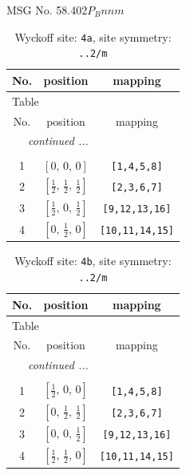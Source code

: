 \documentclass[fleqn,8pt]{jsarticle}
\begin{document}
\setcounter{MaxMatrixCols}{32}

\renewcommand{\tablename}{Table~}
\renewcommand{\figurename}{Figure~}
\begin{center}
\LARGE
MSG No. 58.402\quad$P_{B}nnm$
\end{center}
\renewcommand{\arraystretch}{1.2}
\begin{longtable}{ccc}
\caption{Wyckoff site: {\tt 4a}, site symmetry: {\tt ..2/m}}
 \\
 \hline \hline
No. & position & mapping \\ \hline \endfirsthead

\multicolumn{2}{l}{\tablename\ \thetable{}} \\
 \hline \hline
No. & position & mapping \\ \hline \endhead

 \hline \hline
\multicolumn{2}{r}{\footnotesize\it continued ...} \\ \endfoot

 \hline \hline
\multicolumn{2}{r}{} \\ \endlastfoot

1 & $\left[ 0,\, 0,\, 0 \right]$ & {\tt [1,4,5,8]} \\ \hline
2 & $\left[ \frac{1}{2},\, \frac{1}{2},\, \frac{1}{2} \right]$ & {\tt [2,3,6,7]} \\ \hline
3 & $\left[ \frac{1}{2},\, 0,\, \frac{1}{2} \right]$ & {\tt [9,12,13,16]} \\ \hline
4 & $\left[ 0,\, \frac{1}{2},\, 0 \right]$ & {\tt [10,11,14,15]} \\
\end{longtable}
\renewcommand{\arraystretch}{1.2}
\begin{longtable}{ccc}
\caption{Wyckoff site: {\tt 4b}, site symmetry: {\tt ..2/m}}
 \\
 \hline \hline
No. & position & mapping \\ \hline \endfirsthead

\multicolumn{2}{l}{\tablename\ \thetable{}} \\
 \hline \hline
No. & position & mapping \\ \hline \endhead

 \hline \hline
\multicolumn{2}{r}{\footnotesize\it continued ...} \\ \endfoot

 \hline \hline
\multicolumn{2}{r}{} \\ \endlastfoot

1 & $\left[ \frac{1}{2},\, 0,\, 0 \right]$ & {\tt [1,4,5,8]} \\ \hline
2 & $\left[ 0,\, \frac{1}{2},\, \frac{1}{2} \right]$ & {\tt [2,3,6,7]} \\ \hline
3 & $\left[ 0,\, 0,\, \frac{1}{2} \right]$ & {\tt [9,12,13,16]} \\ \hline
4 & $\left[ \frac{1}{2},\, \frac{1}{2},\, 0 \right]$ & {\tt [10,11,14,15]} \\
\end{longtable}
\end{document}
